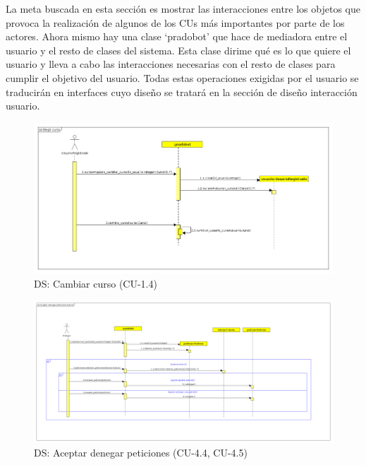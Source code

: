 La meta buscada en esta sección es mostrar las interacciones entre los objetos que provoca la realización de algunos de los CUs más importantes por parte de los actores. Ahora mismo hay una clase \enquote*{pradobot} que hace de mediadora entre el usuario y el resto de clases del sistema. Esta clase dirime qué es lo que quiere el usuario y lleva a cabo las interacciones necesarias con el resto de clases para cumplir el objetivo del usuario. Todas estas operaciones exigidas por el usuario se traducirán en interfaces cuyo diseño se tratará en la sección de diseño interacción usuario.


\begin{figure}[H] %
\centering
\includegraphics[scale=0.3]{imagenes/diagramas/secuencia/analisis/elegir_curso.png}  %

\caption{DS: Cambiar curso (CU-1.4) }\label{figura62}

\end{figure}

\begin{figure}[H] %
\centering
\includegraphics[scale=0.2]{imagenes/diagramas/secuencia/analisis/aceptar_denegar_peticion.png}  %

\caption{DS: Aceptar denegar peticiones (CU-4.4, CU-4.5) }\label{figura72}

\end{figure}

